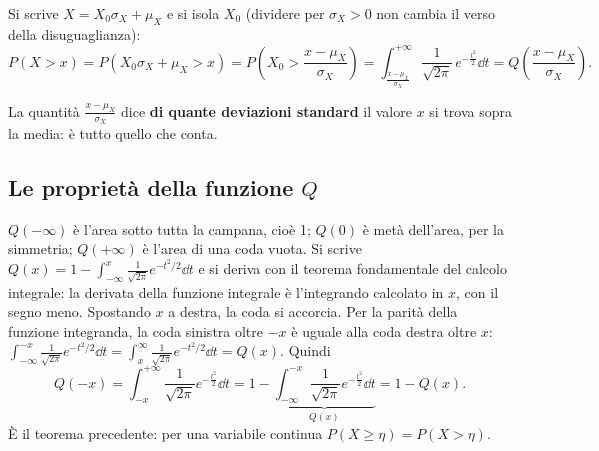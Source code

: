 \begin{dimostrazione}
\passo{} Si scrive $X = X_0 \sigma_X + \mu_X$ e si isola $X_0$ (dividere per $\sigma_X > 0$ non cambia il verso della
disuguaglianza):
\[ P(X > x) = P(X_0 \sigma_X + \mu_X > x) = P\left( X_0 > \frac{x - \mu_X}{\sigma_X} \right) =
   \int_{\frac{x - \mu_X}{\sigma_X}}^{+\infty} \frac{1}{\sqrt{2\pi}}\, e^{-\frac{t^2}{2}} \dd t = Q\left( \frac{x -
   \mu_X}{\sigma_X} \right) . \]
\end{dimostrazione}

La quantità $\frac{x - \mu_X}{\sigma_X}$ dice \textbf{di quante deviazioni standard} il valore $x$ si trova sopra la media:
è tutto quello che conta.

\subsection{Le proprietà della funzione \texorpdfstring{$Q$}{Q}}


\begin{dimostrazione}
 $Q(-\infty)$ è l'area sotto tutta la campana, cioè 1; $Q(0)$ è metà dell'area, per la simmetria; $Q(+\infty)$
è l'area di una coda vuota.
 Si scrive $Q(x) = 1 - \int_{-\infty}^{x} \frac{1}{\sqrt{2\pi}} e^{-t^2/2} \dd t$ e si deriva con il teorema
fondamentale del calcolo integrale: la derivata della funzione integrale è l'integrando calcolato in $x$, con il segno
meno. Spostando $x$ a destra, la coda si accorcia.
 Per la parità della funzione integranda, la coda sinistra oltre $-x$ è uguale alla coda destra oltre $x$:
$\int_{-\infty}^{-x} \frac{1}{\sqrt{2\pi}} e^{-t^2/2} \dd t = \int_{x}^{\infty} \frac{1}{\sqrt{2\pi}} e^{-t^2/2} \dd t = Q(x)$.
Quindi
\[ Q(-x) = \int_{-x}^{+\infty} \frac{1}{\sqrt{2\pi}} e^{-\frac{t^2}{2}} \dd t = 1 - \underbrace{\int_{-\infty}^{-x}
   \frac{1}{\sqrt{2\pi}} e^{-\frac{t^2}{2}} \dd t}_{Q(x)} = 1 - Q(x) . \]
 È il teorema precedente: per una variabile continua $P(X \geq \eta) = P(X > \eta)$.
\end{dimostrazione}

